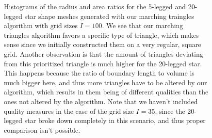 \documentclass[acmtog]{acmart}
\begin{document}
\begin{figure}[H]
\begin{subfigure}{0.22\textwidth}
  \end{subfigure}
  \caption{Histograms of the radius and area ratios for the 5-legged and 20-legged star shape meshes generated with our marching traingles algorithm with grid sizes $I = 100$.
    We see that our marching triangles algorithm favors a specific type of triangle,
    which makes sense since we initially constructed them on a very regular, square grid.
    Another observation is that the amount of triangles deviating from this prioritized triangle is much higher for the 20-legged star.
    This happens because the ratio of boundary length to volume is much bigger here, and thus more triangles have to be altered by our algorithm,
    which results in them being of different qualities than the ones not altered by the algorithm.
    Note that we haven't included quality measures in the case of the grid size $I = 35$,
    since the 20-legged star broke down completely in this scenario, and thus proper comparison isn't possible.}
\end{figure}
\end{document}
